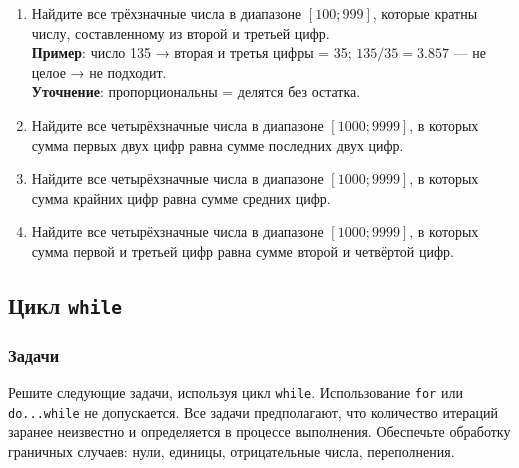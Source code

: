 \documentclass[12pt]{article}
\begin{document}
\begin{enumerate}
    \item Найдите все трёхзначные числа в диапазоне $[100; 999]$, которые кратны числу, составленному из второй и третьей цифр. \\
    \textbf{Пример}: число 135 → вторая и третья цифры = 35; $135 / 35 = 3.857$ — не целое → не подходит. \\
    \textbf{Уточнение}: пропорциональны = делятся без остатка.

    \item Найдите все четырёхзначные числа в диапазоне $[1000; 9999]$, в которых сумма первых двух цифр равна сумме последних двух цифр.

    \item Найдите все четырёхзначные числа в диапазоне $[1000; 9999]$, в которых сумма крайних цифр равна сумме средних цифр.

    \item Найдите все четырёхзначные числа в диапазоне $[1000; 9999]$, в которых сумма первой и третьей цифр равна сумме второй и четвёртой цифр.
\end{enumerate}

\subsection{Цикл \texttt{while}}

\subsubsection*{Задачи}

Решите следующие задачи, используя цикл \texttt{while}. Использование \texttt{for} или \texttt{do...while} не допускается. Все задачи предполагают, что количество итераций заранее неизвестно и определяется в процессе выполнения. Обеспечьте обработку граничных случаев: нули, единицы, отрицательные числа, переполнения.
\end{document}
